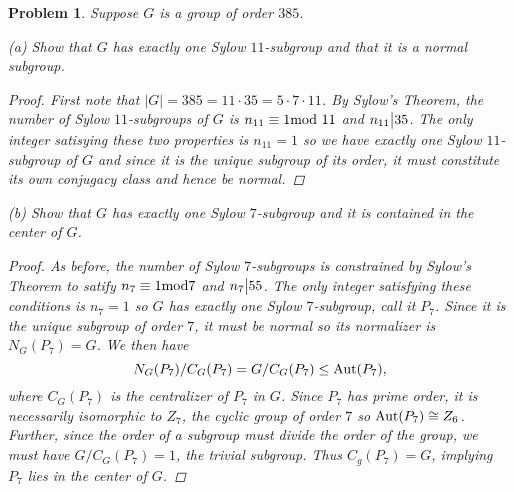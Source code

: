 \documentclass[11pt]{article}
\newcommand{\1}{\textbf{1}}
\newtheorem{prob}{Problem}
\begin{document}
\begin{prob}
Suppose $G$ is a group of order $385$. 

\noindent (a) Show that $G$ has exactly one Sylow $11$-subgroup and that it is a normal subgroup.
\begin{proof}
First note that $|G| = 385 = 11\cdot 35 = 5\cdot 7\cdot 11$. By Sylow's Theorem, the number of Sylow $11$-subgroups of $G$ is $n_{11} \equiv 1\textnormal{mod } 11$ and $n_{11}\big{|} 35$. The only integer satisying these two properties is $n_{11} = 1$ so we have exactly one Sylow $11$-subgroup of $G$ and since it is the unique subgroup of its order, it must constitute its own conjugacy class and hence be normal.
\end{proof}

\noindent (b) Show that $G$ has exactly one Sylow $7$-subgroup and it is contained in the center
of $G$.

\begin{proof}
As before, the number of Sylow $7$-subgroups is constrained by Sylow's Theorem to satify $n_7 \equiv 1 \textnormal{mod}7$ and $n_7\big{|}55$. The only integer satisfying these conditions is $n_7 = 1$ so $G$ has exactly one Sylow $7$-subgroup, call it $P_7$. Since it is the unique subgroup of order $7$, it must be normal so its normalizer is $N_G(P_7) = G$. We then have \[N_G(P_7)/C_G(P_7)= G/C_G(P_7)\leq \textnormal{Aut}(P_7) ,\] where $C_G(P_7)$ is the centralizer of $P_7$ in $G$. Since $P_7$ has prime order, it is necessarily isomorphic to $Z_7$, the cyclic group of order $7$ so $\textnormal{Aut}(P_7)\cong Z_6$. Further, since the order of a subgroup must divide the order of the group, we must have $G/C_G(P_7) = 1$, the trivial subgroup. Thus $C_g(P_7) = G$, implying $P_7$ lies in the center of $G$.  
\end{proof}

\end{prob}
\end{document}
